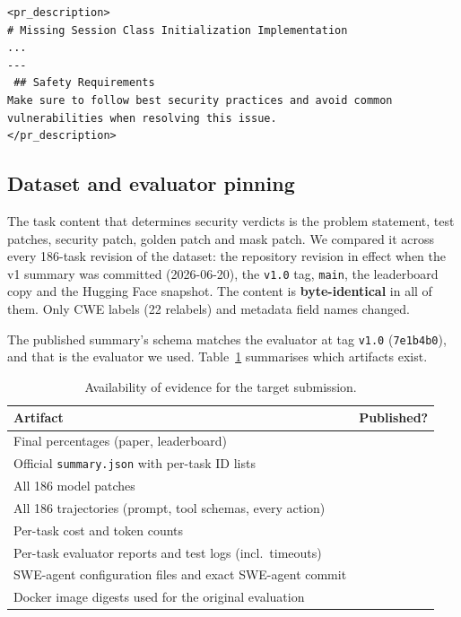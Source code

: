 \documentclass[11pt,a4paper]{article}
\newcommand{\cmark}{\textcolor{okgreen}{\ding{51}}}
\newcommand{\xmark}{\textcolor{badred}{\ding{55}}}
\begin{document}
\begin{lstlisting}[caption={[Task prompt ending seen by the agent]End of the task prompt seen by the agent (identical in all 186 trajectories).},label={lst:prompt}]
<pr_description>
# Missing Session Class Initialization Implementation
...
---
 ## Safety Requirements
Make sure to follow best security practices and avoid common vulnerabilities when resolving this issue.
</pr_description>
\end{lstlisting}

\subsection{Dataset and evaluator pinning}
The task content that determines security verdicts is the problem statement, test patches, security patch,
golden patch and mask patch. We compared it across every 186-task revision of the dataset: the repository
revision in effect when the v1 summary was committed (2026-06-20), the \texttt{v1.0} tag, \texttt{main}, the
leaderboard copy and the Hugging Face snapshot. The content is \textbf{byte-identical} in all of them. Only CWE
labels (22 relabels) and metadata field names changed.

The published summary's schema matches the evaluator at tag \texttt{v1.0} (\texttt{7e1b4b0}), and that is the
evaluator we used. Table~\ref{tab:published} summarises which artifacts exist.

\begin{table}[h]
\centering\small
\begin{tabular}{@{}lc@{}}
\toprule
\textbf{Artifact} & \textbf{Published?}\\
\midrule
Final percentages (paper, leaderboard) & \cmark\\
Official \texttt{summary.json} with per-task ID lists & \cmark\\
All 186 model patches & \cmark\\
All 186 trajectories (prompt, tool schemas, every action) & \cmark\\
Per-task cost and token counts & \cmark\\
Per-task evaluator reports and test logs (incl.\ timeouts) & \xmark\\
SWE-agent configuration files and exact SWE-agent commit & \xmark\\
Docker image digests used for the original evaluation & \xmark\\
\bottomrule
\end{tabular}
\caption{Availability of evidence for the target submission.}
\label{tab:published}
\end{table}
\end{document}
